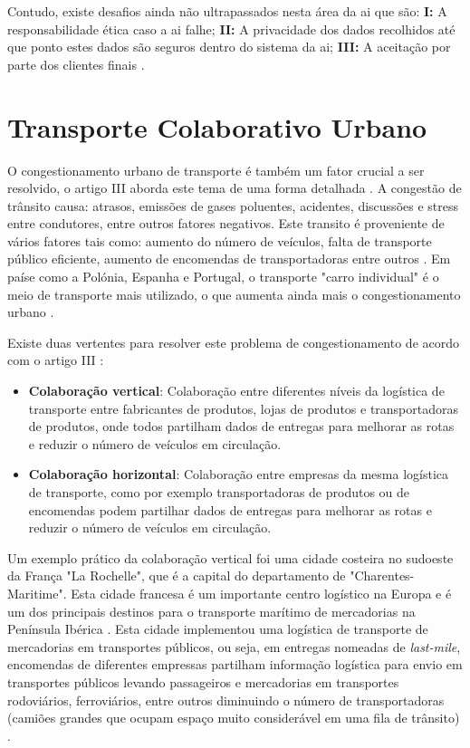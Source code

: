 Contudo, existe desafios ainda não ultrapassados nesta área da \gls{ai} que são: \textbf{I:} A responsabilidade ética caso a \gls{ai} falhe; \textbf{II:} A privacidade dos dados recolhidos até que ponto estes dados são seguros dentro do sistema da \gls{ai}; \textbf{III:} A aceitação por parte dos clientes finais \cite{su162411265}.

\section{Transporte Colaborativo Urbano}
\label{sec:transporte_colaborativo_urbano}

O congestionamento urbano de transporte é também um fator crucial a ser resolvido, o artigo III  aborda este tema de uma forma detalhada \cite{CLEOPHAS2019801}.
A congestão de trânsito causa: atrasos, emissões de gases poluentes, acidentes, discussões e stress entre condutores, entre outros fatores negativos.
Este transito é proveniente de vários fatores tais como: aumento do número de veículos, falta de transporte público eficiente, aumento de encomendas de transportadoras entre outros \cite{CLEOPHAS2019801}.
Em paíse como a Polónia, Espanha e Portugal, o transporte "carro individual" é o meio de transporte mais utilizado, o que aumenta ainda mais o congestionamento urbano \cite{en15114103, NAVARRO2016314, Correia02062024}.

Existe duas vertentes para resolver este problema de congestionamento de acordo com o artigo III \cite{CLEOPHAS2019801}:
\begin{itemize}
    \item \textbf{Colaboração vertical}: Colaboração entre diferentes níveis da logística de transporte entre fabricantes de produtos, lojas de produtos e transportadoras de produtos, onde todos partilham dados de entregas para melhorar as rotas e reduzir o número de veículos em circulação.
    \item \textbf{Colaboração horizontal}: Colaboração entre empresas da mesma logística de transporte, como por exemplo transportadoras de produtos ou de encomendas podem partilhar dados de entregas para melhorar as rotas e reduzir o número de veículos em circulação.
\end{itemize}

Um exemplo prático da colaboração vertical foi uma cidade costeira no sudoeste da França "La Rochelle", que é a capital do departamento de "Charentes-Maritime".
Esta cidade francesa é um importante centro logístico na Europa e é um dos principais destinos para o transporte marítimo de mercadorias na Península Ibérica \cite{FreighttransporttoLaRochelle}.
Esta cidade implementou uma logística de transporte de mercadorias em transportes públicos, ou seja, em entregas nomeadas de \textit{last-mile}, encomendas de diferentes empressas partilham informação logística para envio em transportes públicos levando passageiros e mercadorias em transportes rodoviários, ferroviários, entre outros diminuindo o número de transportadoras (camiões grandes que ocupam espaço muito considerável em uma fila de trânsito) \cite{CLEOPHAS2019801}.

